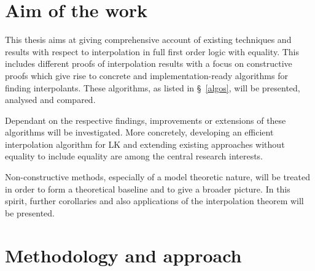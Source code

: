 \documentclass[,%
			paper=a4,%
			DIV11, %
			liststotoc,
			bibtotoc,
			draft=false,%
			numbers=noendperiod
			]{scrartcl}
\theoremstyle{definition}
\begin{document}


\begin{comment}
Software verification
Model checking
Derive invariants
interpolation by its nature disregards all but the predicates relevant to a certain property
can be used for predicate refinement in cegar

often restricted to weaker logics, application to more powerful formalisms such as fol with equality is relevant 
\end{comment}

\section{Aim of the work}


This thesis aims at giving comprehensive account of existing techniques and results with respect to interpolation in full first order logic with equality.
This includes different proofs of interpolation results with a focus on constructive proofs which give rise to concrete and implementation-ready algorithms for finding interpolants.
These algorithms, as listed in \S~\ref{algos}, will be presented, analysed and compared. 

Dependant on the respective findings, improvements or extensions of these algorithms will be investigated.
More concretely, developing an efficient interpolation algorithm for LK and extending existing approaches without equality to include equality are among the central research interests.

Non-constructive methods, especially of a model theoretic nature, will be treated in order to form a theoretical baseline and to give a broader picture.
In this spirit, further corollaries and also applications of the interpolation theorem will be presented.



\section{Methodology and approach}
\end{document}
